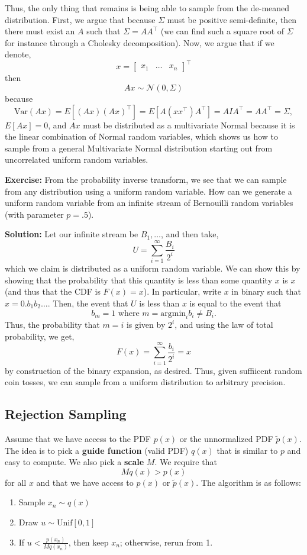 \documentclass{article}
\begin{document}
Thus, the only thing that remains is being able to sample from the de-meaned
distribution. First, we argue that because $\Sigma$ must be positive
semi-definite, then there must exist an $A$ such that $\Sigma = A A^\top$ (we
can find such a square root of $\Sigma$ for instance through a Cholesky
decomposition). Now, we argue that if we denote,
\[ x = \begin{bmatrix} x_1 & \ldots & x_n \end{bmatrix}^\top \]
then
\[ Ax \sim \mathcal{N}(0,\Sigma) \]
because
\[ \text{Var}(Ax) = E[(Ax)(Ax)^\top] = E[A(x x^\top) A^\top] = AIA^\top =
AA^\top = \Sigma, \]
$E[Ax] = 0$, and $Ax$ must be distributed as a multivariate Normal because it is
the linear combination of Normal random variables, which shows us how to sample
from a general Multivariate Normal distribution starting out from uncorrelated
uniform random variables.

\medskip

{\bf Exercise:} From the probability inverse transform, we see that we can
sample from any distribution using a uniform random variable. How can we
generate a uniform random variable from an infinite stream of Bernouilli random
variables (with parameter $p=.5$).

\medskip

{\bf Solution:} Let our infinite stream be $B_1, \ldots$, and then take,
\[ U = \sum_{i=1}^\infty \frac{B_i}{2^i} \]
which we claim is distributed as a uniform random variable. We can show this by
showing that the probability that this quantity is less than some quantity $x$
is $x$ (and thus that the CDF is $F(x) = x$). In particular, write $x$ in binary
such that $x = 0.b_1b_2\ldots$. Then, the event that $U$ is less than $x$ is
equal to the event that
\[ b_m = 1 \text{ where } m = \text{argmin}_i b_i \not= B_i.\]
Thus, the probability that $m = i$ is given by $2^i$, and using the law of total
probability, we get,
\[ F(x) = \sum_{i=1}^\infty \frac{b_i}{2^i} = x \]
by construction of the binary expansion, as desired. Thus, given suffiicent
random coin tosses, we can sample from a uniform distribution to arbitrary
precision.

\subsection{Rejection Sampling}
Assume that we have access to the PDF $p(x)$ or the unnormalized PDF $\tilde p(x)$. The idea is to pick a \textbf{guide function} (valid PDF) $q(x)$ that is similar to $p$ and easy to compute. We also pick a \textbf{scale} $M$. We require that \[
Mq(x) > p(x)
\]
for all $x$ and that we have access to $p(x)$ or $\widetilde{p}(x)$. The algorithm is as follows:
\begin{enumerate}
\item  Sample $x_n \sim q(x)$
\item  Draw $u \sim \text{Unif}[0,1]$
\item  If $u < \frac{p(x_n)}{Mq(x_n)}$, then keep $x_n$; otherwise, rerun from 1.
\end{enumerate}
\end{document}

